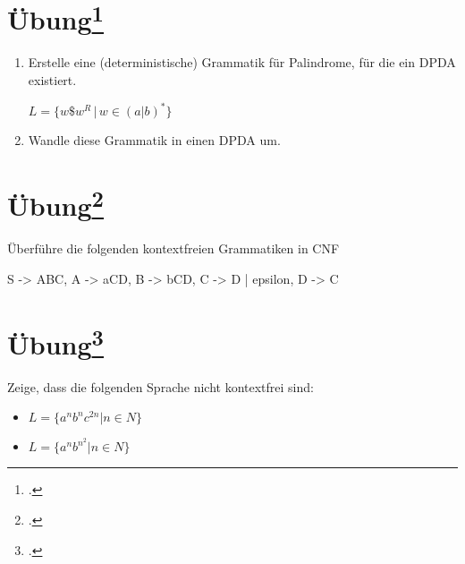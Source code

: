 \documentclass{lehramt-informatik-aufgabe}
\begin{document}
%

\section{Übung\footcite[Seite 34]{theo:fs:2}}

\begin{enumerate}
\item Erstelle eine (deterministische) Grammatik für Palindrome, für die
ein DPDA existiert.

$L = \{ w \$ w^R \, | \, w \in (a|b)^* \}$

\item Wandle diese Grammatik in einen DPDA um.
\end{enumerate}

%

\section{Übung\footcite[Seite 37]{theo:fs:2}}

Überführe die folgenden kontextfreien Grammatiken in CNF

\begin{liProduktionsRegeln}
S -> ABC,
A -> aCD,
B -> bCD,
C -> D | epsilon,
D -> C
\end{liProduktionsRegeln}

%

\section{Übung\footcite[Seite 43]{theo:fs:2}}

Zeige, dass die folgenden Sprache nicht kontextfrei sind:

\begin{itemize}
\item $L = \{ a^n b^n c^{2n} | n \in N \}$
\item $L = \{ a^n b^{n^2} | n \in N \}$
\end{itemize}
\end{document}
